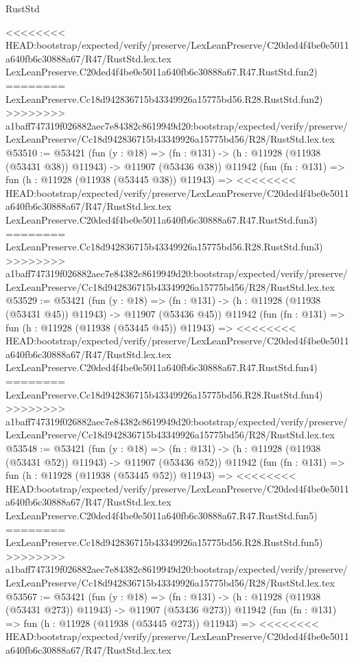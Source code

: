 \begin{lexlean}{RustStd}
\begin{coremodule}
{\begin{coremodule}
{{{{{{{{{{{{{{{{{{{{{{{{{{{{{{{{{{{{{{{{{{{{{{{{{{{{{{{{{{{{{{{{{{{{{{{{{{{{{{{{<<<<<<<< HEAD:bootstrap/expected/verify/preserve/LexLeanPreserve/C20ded4f4be0e5011a640fb6c30888a67/R47/RustStd.lex.tex
    LexLeanPreserve.C20ded4f4be0e5011a640fb6c30888a67.R47.RustStd.fun2)
========
    LexLeanPreserve.Cc18d942836715b43349926a15775bd56.R28.RustStd.fun2)
>>>>>>>> a1baff747319f026882aec7e84382c8619949d20:bootstrap/expected/verify/preserve/LexLeanPreserve/Cc18d942836715b43349926a15775bd56/R28/RustStd.lex.tex
@53510 := @53421
    (fun (y : @18) =>
    (fn : @131) -> (h : @11928 (@11938 (@53431 @38)) @11943) -> @11907 (@53436 @38))
    @11942
    (fun (fn : @131) =>
    fun (h : @11928 (@11938 (@53445 @38)) @11943) =>
<<<<<<<< HEAD:bootstrap/expected/verify/preserve/LexLeanPreserve/C20ded4f4be0e5011a640fb6c30888a67/R47/RustStd.lex.tex
    LexLeanPreserve.C20ded4f4be0e5011a640fb6c30888a67.R47.RustStd.fun3)
========
    LexLeanPreserve.Cc18d942836715b43349926a15775bd56.R28.RustStd.fun3)
>>>>>>>> a1baff747319f026882aec7e84382c8619949d20:bootstrap/expected/verify/preserve/LexLeanPreserve/Cc18d942836715b43349926a15775bd56/R28/RustStd.lex.tex
@53529 := @53421
    (fun (y : @18) =>
    (fn : @131) -> (h : @11928 (@11938 (@53431 @45)) @11943) -> @11907 (@53436 @45))
    @11942
    (fun (fn : @131) =>
    fun (h : @11928 (@11938 (@53445 @45)) @11943) =>
<<<<<<<< HEAD:bootstrap/expected/verify/preserve/LexLeanPreserve/C20ded4f4be0e5011a640fb6c30888a67/R47/RustStd.lex.tex
    LexLeanPreserve.C20ded4f4be0e5011a640fb6c30888a67.R47.RustStd.fun4)
========
    LexLeanPreserve.Cc18d942836715b43349926a15775bd56.R28.RustStd.fun4)
>>>>>>>> a1baff747319f026882aec7e84382c8619949d20:bootstrap/expected/verify/preserve/LexLeanPreserve/Cc18d942836715b43349926a15775bd56/R28/RustStd.lex.tex
@53548 := @53421
    (fun (y : @18) =>
    (fn : @131) -> (h : @11928 (@11938 (@53431 @52)) @11943) -> @11907 (@53436 @52))
    @11942
    (fun (fn : @131) =>
    fun (h : @11928 (@11938 (@53445 @52)) @11943) =>
<<<<<<<< HEAD:bootstrap/expected/verify/preserve/LexLeanPreserve/C20ded4f4be0e5011a640fb6c30888a67/R47/RustStd.lex.tex
    LexLeanPreserve.C20ded4f4be0e5011a640fb6c30888a67.R47.RustStd.fun5)
========
    LexLeanPreserve.Cc18d942836715b43349926a15775bd56.R28.RustStd.fun5)
>>>>>>>> a1baff747319f026882aec7e84382c8619949d20:bootstrap/expected/verify/preserve/LexLeanPreserve/Cc18d942836715b43349926a15775bd56/R28/RustStd.lex.tex
@53567 := @53421
    (fun (y : @18) =>
    (fn : @131) -> (h : @11928 (@11938 (@53431 @273)) @11943) -> @11907 (@53436 @273))
    @11942
    (fun (fn : @131) =>
    fun (h : @11928 (@11938 (@53445 @273)) @11943) =>
<<<<<<<< HEAD:bootstrap/expected/verify/preserve/LexLeanPreserve/C20ded4f4be0e5011a640fb6c30888a67/R47/RustStd.lex.tex
}}}}}}}}}}}}}}}}}}}}}}}}}}}}}}}}}}}}}}}}}}}}}}}}}}}}}}}}}}}}}}}}}}}}}}}}}}}}}}}}
\end{coremodule}}
\end{coremodule}
\end{lexlean}
